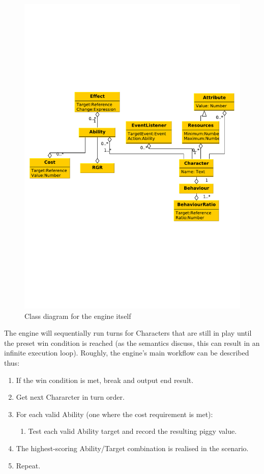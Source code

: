 \begin{figure}
\centering
\includegraphics[scale=.5, clip=true, trim=0cm 8cm 1cm 8cm]{img/engine_class_diagram}
\caption{\label{figure:design:engine:engine}Class diagram for the engine itself}
\end{figure}

The engine will sequentially run turns for Characters that are still in play until the preset win condition is reached (as the semantics discuss, this can result in an infinite execution loop). Roughly, the engine's main workflow can be described thus:

\begin{enumerate}
	\item If the win condition is met, break and output end result.
	\item Get next Chararcter in turn order.
	\item For each valid Ability (one where the cost requirement is met):
	\begin{enumerate}
		\item Test each valid Ability target and record the resulting piggy value.
	\end{enumerate}
	\item The highest-scoring Ability/Target combination is realised in the scenario.
	\item Repeat.
\end{enumerate}


